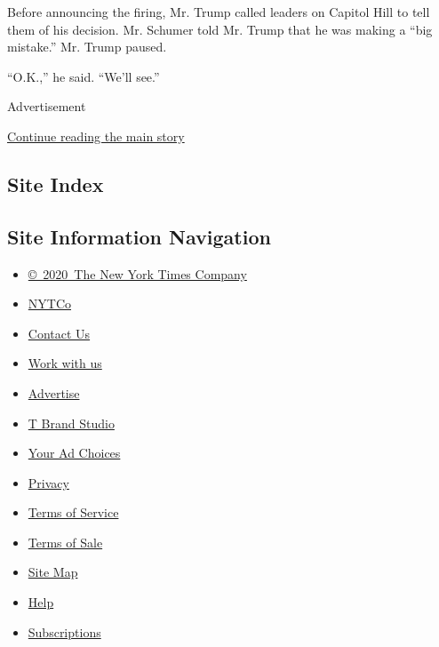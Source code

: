 Before announcing the firing, Mr. Trump called leaders on Capitol Hill
to tell them of his decision. Mr. Schumer told Mr. Trump that he was
making a ``big mistake.'' Mr. Trump paused.

``O.K.,'' he said. ``We'll see.''

Advertisement

\protect\hyperlink{after-bottom}{Continue reading the main story}

\hypertarget{site-index}{%
\subsection{Site Index}\label{site-index}}

\hypertarget{site-information-navigation}{%
\subsection{Site Information
Navigation}\label{site-information-navigation}}

\begin{itemize}
\tightlist
\item
  \href{https://help.nytimes.com/hc/en-us/articles/115014792127-Copyright-notice}{©~2020~The
  New York Times Company}
\end{itemize}

\begin{itemize}
\tightlist
\item
  \href{https://www.nytco.com/}{NYTCo}
\item
  \href{https://help.nytimes.com/hc/en-us/articles/115015385887-Contact-Us}{Contact
  Us}
\item
  \href{https://www.nytco.com/careers/}{Work with us}
\item
  \href{https://nytmediakit.com/}{Advertise}
\item
  \href{http://www.tbrandstudio.com/}{T Brand Studio}
\item
  \href{https://www.nytimes.com/privacy/cookie-policy\#how-do-i-manage-trackers}{Your
  Ad Choices}
\item
  \href{https://www.nytimes.com/privacy}{Privacy}
\item
  \href{https://help.nytimes.com/hc/en-us/articles/115014893428-Terms-of-service}{Terms
  of Service}
\item
  \href{https://help.nytimes.com/hc/en-us/articles/115014893968-Terms-of-sale}{Terms
  of Sale}
\item
  \href{https://spiderbites.nytimes.com}{Site Map}
\item
  \href{https://help.nytimes.com/hc/en-us}{Help}
\item
  \href{https://www.nytimes.com/subscription?campaignId=37WXW}{Subscriptions}
\end{itemize}
